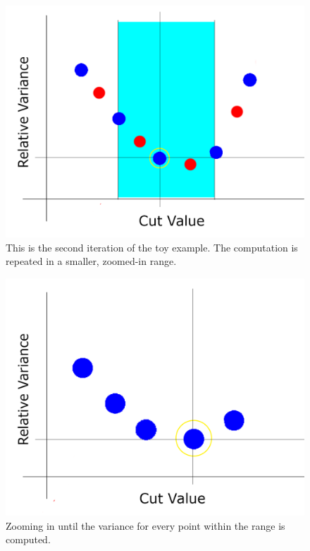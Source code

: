 \begin{figure}[htbp]
	\centering
	\includegraphics[height=0.25 \textheight]{"fig/cbla/divide-and-zoom-in_3"}
	\caption[Illustration explaining the "Divid-and-Zoom-In" region split values computation method 3]{This is the second iteration of the toy example. The computation is repeated in a smaller, zoomed-in range.}
	\label{fig:divide-and-zoom-in_3}
\end{figure}	
\begin{figure}[htbp]
	\centering
	\includegraphics[height=0.25 \textheight]{"fig/cbla/divide-and-zoom-in_4"}
	\caption[Illustration explaining the "Divid-and-Zoom-In" region split values computation method 4]{Zooming in until the variance for every point within the range is computed.}
	\label{fig:divide-and-zoom-in_4}
\end{figure}


